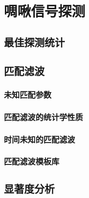 \section{啁啾信号探测}
\subsection{最佳探测统计}
\subsection{匹配滤波}
\subsubsection{未知匹配参数}
\subsubsection{匹配滤波的统计学性质}
\subsubsection{时间未知的匹配滤波}
\subsubsection{匹配滤波模板库}
\subsection{显著度分析}
